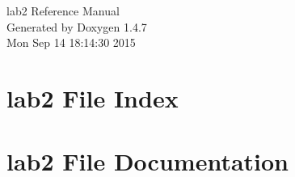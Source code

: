 \documentclass[a4paper]{book}
\begin{document}
\begin{titlepage}
\vspace*{7cm}
\begin{center}
{\Large lab2 Reference Manual}\\
\vspace*{1cm}
{\large Generated by Doxygen 1.4.7}\\
\vspace*{0.5cm}
{\small Mon Sep 14 18:14:30 2015}\\
\end{center}
\end{titlepage}
\clearemptydoublepage
{}
\tableofcontents
\clearemptydoublepage
{}
\chapter{lab2 File Index}

\chapter{lab2 File Documentation}







\printindex
\end{document}
